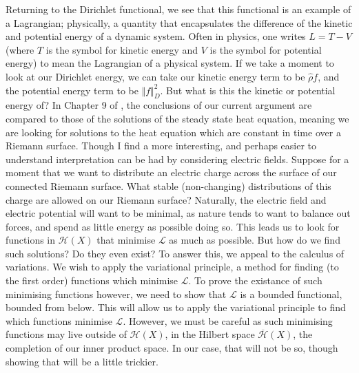 \documentclass[11pt]{report}
\theoremstyle{definition}
\begin{document}
Returning to the Dirichlet functional, we see that this functional is an example of a Lagrangian; physically, a quantity that encapsulates the difference of the kinetic and potential energy of a dynamic system. Often in physics, one writes $L=T-V$ (where $T$ is the symbol for kinetic energy and $V$ is the symbol for potential energy) to mean the Lagrangian of a physical system. If we take a moment to look at our Dirichlet energy, we can take our kinetic energy term to be $\hat{\rho}f$, and the potential energy term to be $\Vert f\Vert ^2_D$. But what is this the kinetic or potential energy of? In Chapter 9 of \cite{donaldson}, the conclusions of our current argument are compared to those of the solutions of the steady state heat equation, meaning we are looking for solutions to the heat equation which are constant in time over a Riemann surface. Though I find a more interesting, and perhaps easier to understand interpretation can be had by considering electric fields. Suppose for a moment that we want to distribute an electric charge across the surface of our connected Riemann surface. What stable (non-changing) distributions of this charge are allowed on our Riemann surface? Naturally, the electric field and electric potential will want to be minimal, as nature tends to want to balance out forces, and spend as little energy as possible doing so. This leads us to look for functions in $\mathcal{H}(X)$ that minimise $\mathcal{L}$ as much as possible. But how do we find such solutions? Do they even exist? To answer this, we appeal to the calculus of variations. We wish to apply the variational principle, a method for finding (to the first order) functions which minimise $\mathcal{L}$. To prove the existance of such minimising functions however, we need to show that $\mathcal{L}$ is a bounded functional, bounded from below. This will allow us to apply the variational principle to find which functions minimise $\mathcal{L}$. However, we must be careful as such minimising functions may live outside of $\mathcal{H}(X)$, in the Hilbert space $\overline{\mathcal{H}}(X)$, the completion of our inner product space. In our case, that will not be so, though showing that will be a little trickier.
\end{document}
